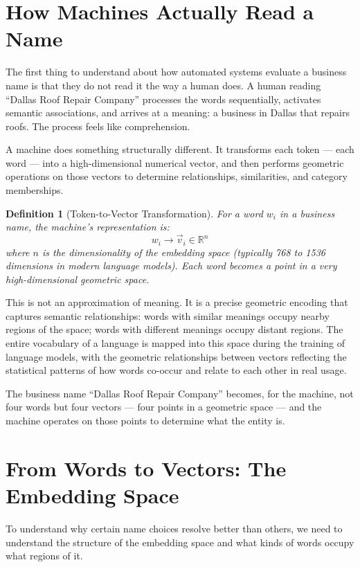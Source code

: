 \documentclass[12pt, openany]{book}
\theoremstyle{thmstyle}
\theoremstyle{defstyle}
\newtheorem{definition}{Definition}[chapter]
\begin{document}
\section{How Machines Actually Read a Name}

The first thing to understand about how automated systems evaluate a business name is that they do not read it the way a human does. A human reading ``Dallas Roof Repair Company'' processes the words sequentially, activates semantic associations, and arrives at a meaning: a business in Dallas that repairs roofs. The process feels like comprehension.

A machine does something structurally different. It transforms each token --- each word --- into a high-dimensional numerical vector, and then performs geometric operations on those vectors to determine relationships, similarities, and category memberships.

\begin{definition}[Token-to-Vector Transformation]
For a word $w_i$ in a business name, the machine's representation is:
\[
w_i \rightarrow \vec{v}_i \in \mathbb{R}^n
\]
where $n$ is the dimensionality of the embedding space (typically 768 to 1536 dimensions in modern language models). Each word becomes a point in a very high-dimensional geometric space.
\end{definition}

This is not an approximation of meaning. It is a precise geometric encoding that captures semantic relationships: words with similar meanings occupy nearby regions of the space; words with different meanings occupy distant regions. The entire vocabulary of a language is mapped into this space during the training of language models, with the geometric relationships between vectors reflecting the statistical patterns of how words co-occur and relate to each other in real usage.

The business name ``Dallas Roof Repair Company'' becomes, for the machine, not four words but four vectors --- four points in a geometric space --- and the machine operates on those points to determine what the entity is.

\section{From Words to Vectors: The Embedding Space}

To understand why certain name choices resolve better than others, we need to understand the structure of the embedding space and what kinds of words occupy what regions of it.
\end{document}
